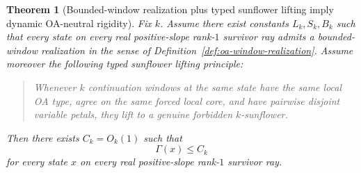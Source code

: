 \documentclass[11pt]{article}
\newtheorem{theorem}{Theorem}[section]
\theoremstyle{definition}
\newcommand{\1}{\mathbf{1}}
\begin{document}
\begin{theorem}[Bounded-window realization plus typed sunflower lifting imply dynamic OA-neutral rigidity]\label{thm:oa-window-rigidity}
Fix $k$. Assume there exist constants $L_k,S_k,B_k$ such that every state on every real positive-slope rank-$1$ survivor ray admits a bounded-window realization in the sense of Definition~\ref{def:oa-window-realization}. Assume moreover the following typed sunflower lifting principle:

\begin{quote}
Whenever $k$ continuation windows at the same state have the same local OA type, agree on the same forced local core, and have pairwise disjoint variable petals, they lift to a genuine forbidden $k$-sunflower.
\end{quote}

Then there exists $C_k=O_k(1)$ such that
\[
\Gamma(x)\le C_k
\]
for every state $x$ on every real positive-slope rank-$1$ survivor ray.
\end{theorem}
\end{document}
